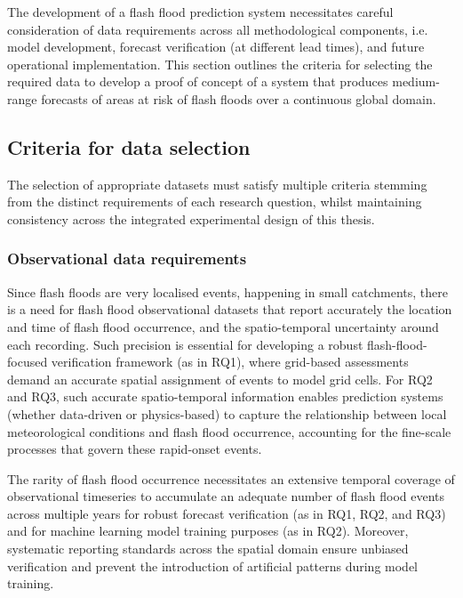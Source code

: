 The development of a flash flood prediction system necessitates careful consideration of data requirements across all methodological components, i.e. model development, forecast verification (at different lead times), and future operational implementation. This section outlines the criteria for selecting the required data to develop a proof of concept of a system that produces medium-range forecasts of areas at risk of flash floods over a continuous global domain. 

\subsection{Criteria for data selection}

The selection of appropriate datasets must satisfy multiple criteria stemming from the distinct requirements of each research question, whilst maintaining consistency across the integrated experimental design of this thesis.

\subsubsection{Observational data requirements}

Since  flash floods are very localised events, happening in small catchments, there is a need for flash flood observational datasets that report accurately the location and time of flash flood occurrence, and the spatio-temporal uncertainty around each recording. Such precision is essential for developing a robust flash-flood-focused verification framework (as in RQ1), where grid-based assessments demand an accurate spatial assignment of events to model grid cells. For RQ2 and RQ3, such accurate spatio-temporal information enables prediction systems (whether data-driven or physics-based) to capture the relationship between local meteorological conditions and flash flood occurrence, accounting for the fine-scale processes that govern these rapid-onset events.

The  rarity of flash flood occurrence necessitates an extensive temporal coverage of observational timeseries to accumulate an adequate number of flash flood events across multiple years for robust forecast verification (as in RQ1, RQ2, and RQ3) and for machine learning model training purposes (as in RQ2). Moreover, systematic reporting standards across the spatial domain ensure unbiased verification and prevent the introduction of artificial patterns during model training.

